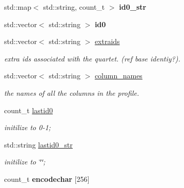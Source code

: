 \begin{DoxyCompactItemize}
\item 
\hypertarget{classprofile__header_ae842775c9a99d1d1d6e5bc4352ca6c03}{std\-::map$<$ std\-::string, count\-\_\-t $>$ {\bfseries id0\-\_\-str}}\label{classprofile__header_ae842775c9a99d1d1d6e5bc4352ca6c03}

\item 
\hypertarget{classprofile__header_a33f2188509a76d35d884f19dc163cfa5}{std\-::vector$<$ std\-::string $>$ {\bfseries id0}}\label{classprofile__header_a33f2188509a76d35d884f19dc163cfa5}

\item 
\hypertarget{classprofile__header_a60542dedeb25a6e9d80e0214978b4051}{std\-::vector$<$ std\-::string $>$ \hyperlink{classprofile__header_a60542dedeb25a6e9d80e0214978b4051}{extraids}}\label{classprofile__header_a60542dedeb25a6e9d80e0214978b4051}

\begin{DoxyCompactList}\small\item\em extra ids associated with the quartet. (ref base identiy?). \end{DoxyCompactList}\item 
\hypertarget{classprofile__header_af64f7e8c7fe40d481deab3df45371266}{std\-::vector$<$ std\-::string $>$ \hyperlink{classprofile__header_af64f7e8c7fe40d481deab3df45371266}{column\-\_\-names}}\label{classprofile__header_af64f7e8c7fe40d481deab3df45371266}

\begin{DoxyCompactList}\small\item\em the names of all the columns in the profile. \end{DoxyCompactList}\item 
\hypertarget{classprofile__header_a6c00bb498c591642aa959d6288b2fdda}{count\-\_\-t \hyperlink{classprofile__header_a6c00bb498c591642aa959d6288b2fdda}{lastid0}}\label{classprofile__header_a6c00bb498c591642aa959d6288b2fdda}

\begin{DoxyCompactList}\small\item\em initilize to 0-\/1; \end{DoxyCompactList}\item 
\hypertarget{classprofile__header_a94f6baf680dc21ebcd2b1485dd5ca4c1}{std\-::string \hyperlink{classprofile__header_a94f6baf680dc21ebcd2b1485dd5ca4c1}{lastid0\-\_\-str}}\label{classprofile__header_a94f6baf680dc21ebcd2b1485dd5ca4c1}

\begin{DoxyCompactList}\small\item\em initilize to \char`\"{}\char`\"{}; \end{DoxyCompactList}\item 
\hypertarget{classprofile__header_a28657cc0f1f29f048f3a6c88d1c32504}{count\-\_\-t {\bfseries encodechar} \mbox{[}256\mbox{]}}\label{classprofile__header_a28657cc0f1f29f048f3a6c88d1c32504}


\end{DoxyCompactItemize}
